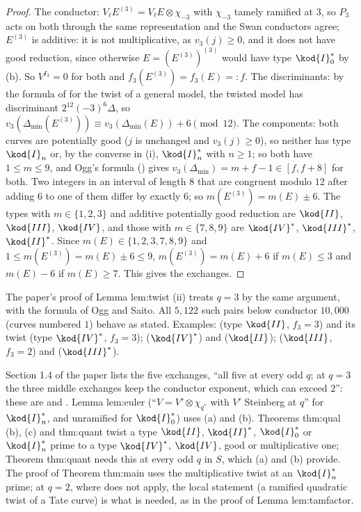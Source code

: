 \begin{proof}
The conductor: $V_\ell E^{(3)}=V_\ell E\otimes\chi_{-3}$ with $\chi_{-3}$ tamely ramified at $3$, so $P_3$ acts on both through the same
representation and the Swan conductors agree; $E^{(3)}$ is additive: it is not multiplicative, as $v_3(j)\ge0$, and it does not have good
reduction, since otherwise $E=(E^{(3)})^{(3)}$ would have type $\kod{I}_0^*$ by (b). So
$V^{I_3}=0$ for both and $f_3(E^{(3)})=f_3(E)=:f$.
The discriminants: by the formula of  for the twist of a general model, the twisted model has discriminant
$2^{12}(-3)^6\Delta$, so $v_3(\Delta_{\min}(E^{(3)}))\equiv v_3(\Delta_{\min}(E))+6\pmod{12}$.
The components: both curves are potentially good ($j$ is unchanged and $v_3(j)\ge0$), so neither has type $\kod{I}_n$ or, by the converse
in (i), $\kod{I}_n^*$ with $n\ge1$; so both have $1\le m\le9$, and Ogg's formula
() gives $v_3(\Delta_{\min})=m+f-1\in[f,f+8]$ for both. Two integers in an interval of length $8$ that are
congruent modulo $12$ after adding $6$ to one of them differ by exactly $6$; so $m(E^{(3)})=m(E)\pm6$. The types with $m\in\{1,2,3\}$ and
additive potentially good reduction are $\kod{II}$, $\kod{III}$, $\kod{IV}$, and those with $m\in\{7,8,9\}$ are $\kod{IV}^*$, $\kod{III}^*$,
$\kod{II}^*$. Since $m(E)\in\{1,2,3,7,8,9\}$ and $1\le m(E^{(3)})=m(E)\pm6\le9$, $m(E^{(3)})=m(E)+6$ if $m(E)\le3$ and $m(E)-6$ if $m(E)\ge7$. This
gives the exchanges.
\end{proof}

The paper's proof of Lemma lem:twist (ii) treats $q=3$ by the same argument, with the formula of Ogg and Saito. All $5{,}122$ such pairs below conductor $10{,}000$ (curves numbered $1$) behave as stated. Examples:
 (type $\kod{II}$, $f_3=3$) and its twist  (type $\kod{IV}^*$, $f_3=3$);  ($\kod{IV}^*$) and 
($\kod{II}$);  ($\kod{III}$, $f_3=2$) and  ($\kod{III}^*$).

\begin{paperlink}
Section 1.4 of the paper lists the five exchanges, ``all five at every odd $q$; at $q=3$ the three middle exchanges keep the
conductor exponent, which can exceed $2$'': these are  and . Lemma lem:euler (``$V=V'\otimes\chi_{q^*}$ with $V'$
Steinberg at $q$'' for $\kod{I}_n^*$, and unramified for $\kod{I}_0^*$) uses (a) and (b). Theorems thm:qual (b), (c) and thm:quant
twist a type $\kod{II}$, $\kod{II}^*$, $\kod{I}_0^*$ or $\kod{I}_n^*$ prime to a type $\kod{IV}^*$, $\kod{IV}$, good or multiplicative one; Theorem
thm:quant needs this at every odd $q$ in $S$, which (a) and (b) provide. The proof of Theorem thm:main uses the multiplicative twist at an
$\kod{I}_n^*$ prime; at $q=2$, where  does not apply, the local statement
 (a ramified quadratic twist of a Tate curve) is what is needed, as in the proof of Lemma
lem:tamfactor.
\end{paperlink}

